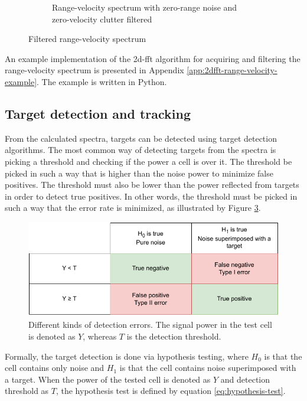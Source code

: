 \begin{figure}[H]
\begin{subfigure}[b]{0.49\textwidth}
        \caption{Range-velocity spectrum with zero-range noise and zero-velocity clutter filtered}
        \label{fig:range-velocity-both-filtered}
    \end{subfigure}
    \caption{Filtered range-velocity spectrum}
    \label{fig:range-velocity-spectrum-filtered}
\end{figure}

An example implementation of the \gls{2d-fft} algorithm for acquiring and filtering the range-velocity spectrum
is presented in Appendix \ref{app:2dfft-range-velocity-example}. The example is written in Python.

\subsection{Target detection and tracking}
\label{sec:cfar}
From the calculated spectra, targets can be detected using target detection algorithms.
The most common way of detecting targets from the spectra is picking a threshold and checking if the power a cell is over it.
The threshold be picked in such a way that is higher than the noise power to minimize false positives.
The threshold must also be lower than the power reflected from targets in order to detect true positives. 
In other words, the threshold must be picked in such a way that the error rate is minimized, as illustrated by Figure \ref{fig:error-matrix}.

\begin{figure}
    \centering
    \includegraphics{fig/4/error-matrix.pdf}
    \caption{Different kinds of detection errors. The signal power in the test cell is denoted as $Y$, whereas $T$ is the detection threshold.}
    \label{fig:error-matrix}
\end{figure}

Formally, the target detection is done via hypothesis testing, where $H_0$ is that the cell contains only noise
and $H_1$ is that the cell contains noise superimposed with a target.
When the power of the tested cell is denoted as $Y$ and detection threshold as $T$,
the hypothesis test is defined by equation \ref{eq:hypothesis-test}.

